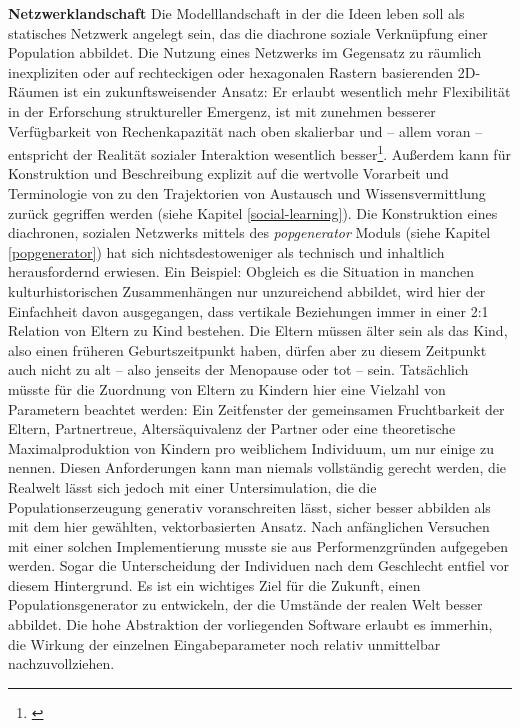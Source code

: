 \documentclass[openany,twoside,twocolumn]{book}
\let\rmarkdownfootnote\footnote%
\def\footnote{\protect\rmarkdownfootnote}
\begin{document}
\textbf{Netzwerklandschaft} \newline  Die Modelllandschaft in der die
Ideen leben soll als statisches Netzwerk angelegt sein, das die
diachrone soziale Verknüpfung einer Population abbildet. Die Nutzung
eines Netzwerks im Gegensatz zu räumlich inexpliziten oder auf
rechteckigen oder hexagonalen Rastern basierenden 2D-Räumen ist ein
zukunftsweisender Ansatz: Er erlaubt wesentlich mehr Flexibilität in der
Erforschung struktureller Emergenz, ist mit zunehmen besserer
Verfügbarkeit von Rechenkapazität nach oben skalierbar und -- allem
voran -- entspricht der Realität sozialer Interaktion wesentlich
besser\footnote{\textcite{lehmann_complex_2018}}. Außerdem kann für
Konstruktion und Beschreibung explizit auf die wertvolle Vorarbeit und
Terminologie von \autocite{cavalli-sforza_cultural_1981} zu den
Trajektorien von Austausch und Wissensvermittlung zurück gegriffen
werden (siehe Kapitel \ref{social-learning}). Die Konstruktion eines
diachronen, sozialen Netzwerks mittels des \emph{popgenerator} Moduls
(siehe Kapitel \ref{popgenerator}) hat sich nichtsdestoweniger als
technisch und inhaltlich herausfordernd erwiesen. Ein Beispiel: Obgleich
es die Situation in manchen kulturhistorischen Zusammenhängen nur
unzureichend abbildet, wird hier der Einfachheit davon ausgegangen, dass
vertikale Beziehungen immer in einer 2:1 Relation von Eltern zu Kind
bestehen. Die Eltern müssen älter sein als das Kind, also einen früheren
Geburtszeitpunkt haben, dürfen aber zu diesem Zeitpunkt auch nicht zu
alt -- also jenseits der Menopause oder tot -- sein. Tatsächlich müsste
für die Zuordnung von Eltern zu Kindern hier eine Vielzahl von
Parametern beachtet werden: Ein Zeitfenster der gemeinsamen
Fruchtbarkeit der Eltern, Partnertreue, Altersäquivalenz der Partner
oder eine theoretische Maximalproduktion von Kindern pro weiblichem
Individuum, um nur einige zu nennen. Diesen Anforderungen kann man
niemals vollständig gerecht werden, die Realwelt lässt sich jedoch mit
einer Untersimulation, die die Populationserzeugung generativ
voranschreiten lässt, sicher besser abbilden als mit dem hier gewählten,
vektorbasierten Ansatz. Nach anfänglichen Versuchen mit einer solchen
Implementierung musste sie aus Performenzgründen aufgegeben werden.
Sogar die Unterscheidung der Individuen nach dem Geschlecht entfiel vor
diesem Hintergrund. Es ist ein wichtiges Ziel für die Zukunft, einen
Populationsgenerator zu entwickeln, der die Umstände der realen Welt
besser abbildet. Die hohe Abstraktion der vorliegenden Software erlaubt
es immerhin, die Wirkung der einzelnen Eingabeparameter noch relativ
unmittelbar nachzuvollziehen.
\end{document}
